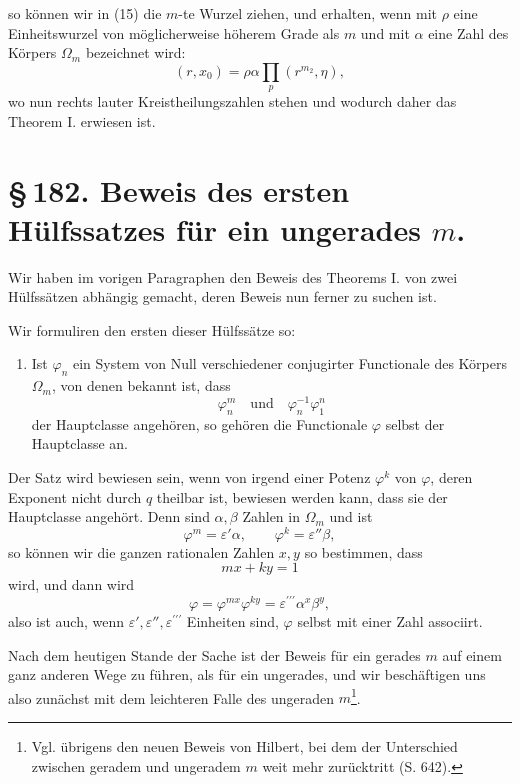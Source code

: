\documentclass[11pt]{article}
\begin{document}
so können wir in (15) die $m$-te Wurzel ziehen, und erhalten, wenn mit $\rho$ eine Einheitswurzel von möglicherweise höherem Grade als $m$ und mit $\alpha$ eine Zahl des Körpers $\Omega_m$ bezeichnet wird:
\begin{equation}
  (r,x_0)=\rho\alpha\prod_p(r^{m_2},\eta),
\tag{16}
\end{equation}
wo nun rechts lauter Kreistheilungszahlen stehen und wodurch daher das Theorem I. erwiesen ist.

\clearpage
\section*{\S\,182. Beweis des ersten Hülfssatzes für ein ungerades $m$.}

Wir haben im vorigen Paragraphen den Beweis des Theorems I. von zwei Hülfssätzen abhängig gemacht, deren Beweis nun ferner zu suchen ist.

Wir formuliren den ersten dieser Hülfssätze so:

\begin{enumerate}[label=\alph*),leftmargin=2.2em]
\item Ist $\varphi_n$ ein System von Null verschiedener conjugirter Functionale des Körpers $\Omega_m$, von denen bekannt ist, dass
\[
\varphi_n^m\quad\text{und}\quad\varphi_n^{-1}\varphi_1^n
\]
der Hauptclasse angehören, so gehören die Functionale $\varphi$ selbst der Hauptclasse an.
\end{enumerate}

Der Satz wird bewiesen sein, wenn von irgend einer Potenz $\varphi^k$ von $\varphi$, deren Exponent nicht durch $q$ theilbar ist, bewiesen werden kann, dass sie der Hauptclasse angehört. Denn sind $\alpha,\beta$ Zahlen in $\Omega_m$ und ist
\[
\varphi^m=\varepsilon'\alpha,
\qquad
\varphi^k=\varepsilon''\beta,
\]
so können wir die ganzen rationalen Zahlen $x,y$ so bestimmen, dass
\[
mx+ky=1
\]
wird, und dann wird
\[
\varphi=\varphi^{mx}\varphi^{ky}=\varepsilon^{\prime\prime\prime}\alpha^x\beta^y,
\]
also ist auch, wenn $\varepsilon',\varepsilon'',\varepsilon^{\prime\prime\prime}$ Einheiten sind, $\varphi$ selbst mit einer Zahl associirt.

Nach dem heutigen Stande der Sache ist der Beweis für ein gerades $m$ auf einem ganz anderen Wege zu führen, als für ein ungerades, und wir beschäftigen uns also zunächst mit dem leichteren Falle des ungeraden $m$\footnote{Vgl. übrigens den neuen Beweis von Hilbert, bei dem der Unterschied zwischen geradem und ungeradem $m$ weit mehr zurücktritt (S. 642).}.
\end{document}
